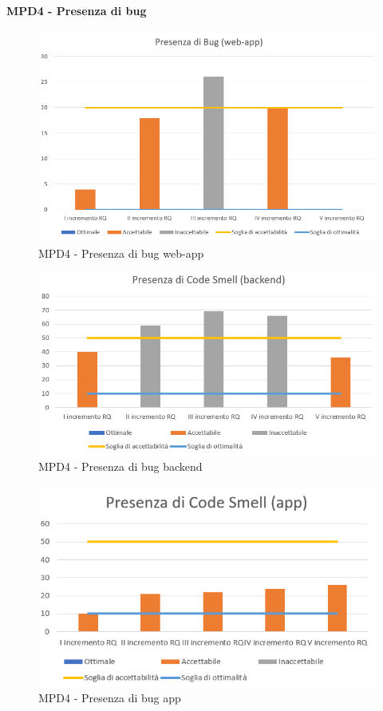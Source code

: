   \clearpage
  \paragraph{MPD4 - Presenza di bug}
  \begin{figure}[h!]
    \centering
      \includegraphics[scale=0.95]{Immagini/Bug WA.PNG}
    \caption{MPD4 - Presenza di bug web-app}
  \end{figure}

  \begin{figure}[h!]
    \centering
      \includegraphics[scale=1]{Immagini/CodeSmell BE.PNG}
    \caption{MPD4 - Presenza di bug backend}
  \end{figure}

  \begin{figure}[h!]
    \centering
      \includegraphics[scale=1]{Immagini/CodeSmell APP.PNG}
    \caption{MPD4 - Presenza di bug app}
  \end{figure}


